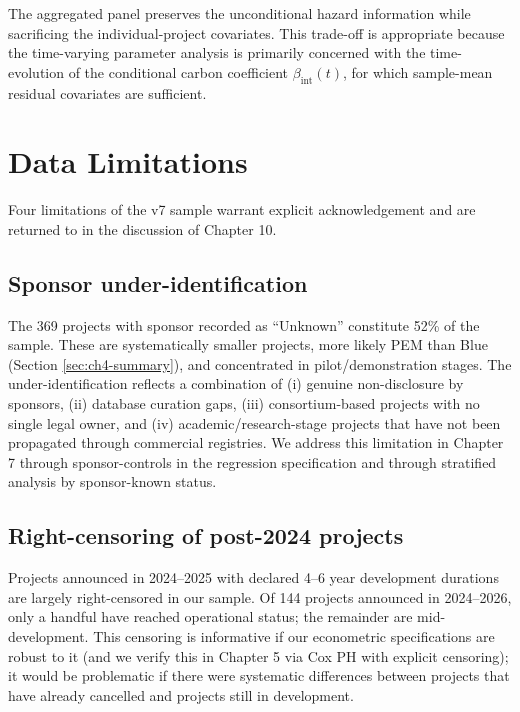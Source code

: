 \documentclass[11pt,a4paper]{article}
\begin{document}
The aggregated panel preserves the unconditional hazard information while sacrificing the individual-project covariates. This trade-off is appropriate because the time-varying parameter analysis is primarily concerned with the time-evolution of the conditional carbon coefficient $\beta_{\mathrm{int}}(t)$, for which sample-mean residual covariates are sufficient.

\section{Data Limitations}
\label{sec:ch4-limitations}

Four limitations of the v7 sample warrant explicit acknowledgement and are returned to in the discussion of Chapter 10.

\subsection{Sponsor under-identification}

The 369 projects with sponsor recorded as ``Unknown'' constitute 52\% of the sample. These are systematically smaller projects, more likely PEM than Blue (Section \ref{sec:ch4-summary}), and concentrated in pilot/demonstration stages. The under-identification reflects a combination of (i) genuine non-disclosure by sponsors, (ii) database curation gaps, (iii) consortium-based projects with no single legal owner, and (iv) academic/research-stage projects that have not been propagated through commercial registries. We address this limitation in Chapter 7 through sponsor-controls in the regression specification and through stratified analysis by sponsor-known status.

\subsection{Right-censoring of post-2024 projects}

Projects announced in 2024--2025 with declared 4--6 year development durations are largely right-censored in our sample. Of 144 projects announced in 2024--2026, only a handful have reached operational status; the remainder are mid-development. This censoring is informative if our econometric specifications are robust to it (and we verify this in Chapter 5 via Cox PH with explicit censoring); it would be problematic if there were systematic differences between projects that have already cancelled and projects still in development.
\end{document}
